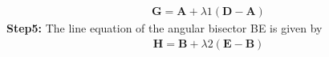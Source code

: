 \documentclass[10pt,a4paper]{report}
\let\vec\mathbf
\begin{document}
\begin{multicols}{2}
\begin{align}
\vec{G} = \vec{A} + \lambda1\vec{(D-A)}
\end{align}
\textbf{Step5:} The line equation of the angular bisector BE is given by
\begin{align}
\vec{H} = \vec{B} + \lambda2(\vec{E-B})
\end{align}

\end{multicols}
\end{document}
